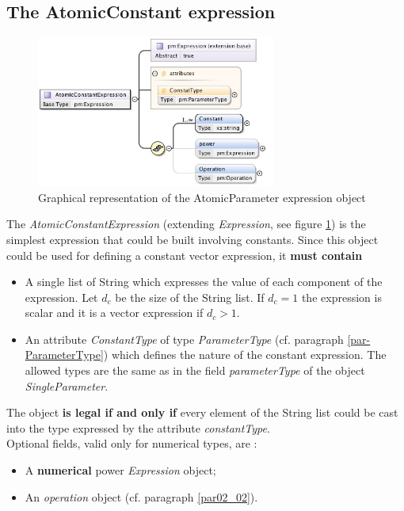 \documentclass[a4paper,11pt] {ivoa}
\begin{document}
\subsection{The AtomicConstant expression}\label{par02_03}
\begin{figure}[htbp]
\begin{center}
\includegraphics[width=0.7\textwidth]{pictures/AtomicConstant.jpg} 
\caption{Graphical representation of the AtomicParameter expression object}
\label{Pic-AtomicConstant}
\end{center}
\end{figure}

The {\it AtomicConstantExpression} (extending {\it Expression}, see figure \ref{Pic-AtomicConstant})
is the simplest expression that could be built involving constants. Since this object could be used
for defining a constant vector expression, it {\bf must contain}
\begin{itemize}
\item A single list of String which expresses the value of each component of the expression. Let
$d_c$ be the size of the String list. If $d_c=1$ the expression is scalar and it is a vector
expression if $d_c>1$.
\item An attribute {\it ConstantType} of type {\it ParameterType} (cf. paragraph
\ref{par-ParameterType}) which defines the nature of the constant expression. The allowed
types are the same as in the field {\it parameterType} of the object {\it SingleParameter}.
\end{itemize}
The object {\bf is legal if and only if} every element of the String list could be cast into the
type expressed by the attribute {\it constantType}.\\

Optional fields, valid only for numerical types, are : 
\begin{itemize}
\item A  {\bf numerical} power {\it Expression} object;
\item An {\it operation} object (cf. paragraph \ref{par02_02}).
\end{itemize}
\end{document}
